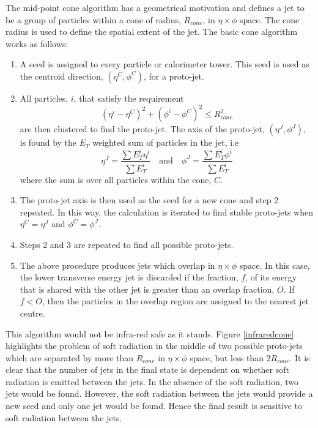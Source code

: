 The mid-point cone algorithm has a geometrical motivation and defines a jet to be a group of particles within a cone of radius, $R_{cone}$, in $\eta \times \phi$ space. The cone radius is used to define the spatial extent of the jet. The basic cone algorithm \cite{Blazey:2000qt} works as follows:
\begin{enumerate}
\item A seed is assigned to every particle or calorimeter tower. This seed is used as the centroid direction, $\left(\eta^C, \phi^C\right)$, for a proto-jet. 

\item All particles, $i$, that satisfy the requirement
\begin{equation}
\left( \eta^i - \eta^C \right)^2 + \left( \phi^i -\phi^C \right)^2 \leq R_{cone}^2
\end{equation}
are then clustered to find the proto-jet. The axis of the proto-jet, $\left(\eta^J, \phi^J\right)$, is found by the $E_T$ weighted sum of particles in the jet, i.e
\begin{equation}
\eta^J = \frac{\sum{E_T^i\eta^i}}{\sum{E_T^i}} \quad \text{and} \quad
\phi^J = \frac{\sum{E_T^i\phi^i}}{\sum{E_T^i}}
\end{equation}
where the sum is over all particles within the cone, $C$.

\item The proto-jet axis is then used as the seed for a new cone and step 2 repeated. In this way, the calculation is iterated to find stable proto-jets when $\eta^C = \eta^J$ and $\phi^C = \phi^J$.

\item Steps 2 and 3 are repeated to find all possible proto-jets.

\item The above procedure produces jets which overlap in $\eta \times \phi$ space. In this case, the lower transverse energy jet is discarded if the fraction, $f$, of its energy that is shared with the other jet is greater than an overlap fraction, $O$. If $f < O$, then the particles in the overlap region are assigned to the nearest jet centre.

\end{enumerate}

This algorithm would not be infra-red safe as it stands. Figure \ref{infraredcone} highlights the problem of soft radiation in the middle of two possible proto-jets which are separated by more than $R_{cone}$ in $\eta \times \phi$ space, but less than $2R_{cone}$. It is clear that the number of jets in the final state is dependent on whether soft radiation is emitted between the jets. In the absence of the soft radiation, two jets would be found. However, the soft radiation between the jets would provide a new seed and only one jet would be found. Hence the final result is sensitive to soft radiation between the jets. 


